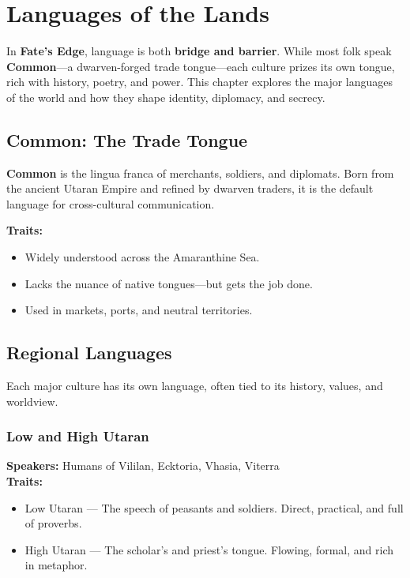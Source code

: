 
\chapter{Languages of the Lands}
\label{ch:languages}

In \textbf{Fate's Edge}, language is both \textbf{bridge and barrier}. While most folk speak \textbf{Common}—a dwarven-forged trade tongue—each culture prizes its own tongue, rich with history, poetry, and power. This chapter explores the major languages of the world and how they shape identity, diplomacy, and secrecy.

\section{Common: The Trade Tongue}

\textbf{Common} is the lingua franca of merchants, soldiers, and diplomats. Born from the ancient Utaran Empire and refined by dwarven traders, it is the default language for cross-cultural communication.

\textbf{Traits:}
\begin{itemize}
  \item Widely understood across the Amaranthine Sea.
  \item Lacks the nuance of native tongues—but gets the job done.
  \item Used in markets, ports, and neutral territories.
\end{itemize}

\section{Regional Languages}

Each major culture has its own language, often tied to its history, values, and worldview.

\subsection*{Low and High Utaran}

\textbf{Speakers:} Humans of Vililan, Ecktoria, Vhasia, Viterra \\
\textbf{Traits:} 
\begin{itemize}
  \item Low Utaran — The speech of peasants and soldiers. Direct, practical, and full of proverbs.
  \item High Utaran — The scholar's and priest's tongue. Flowing, formal, and rich in metaphor.
\end{itemize}

